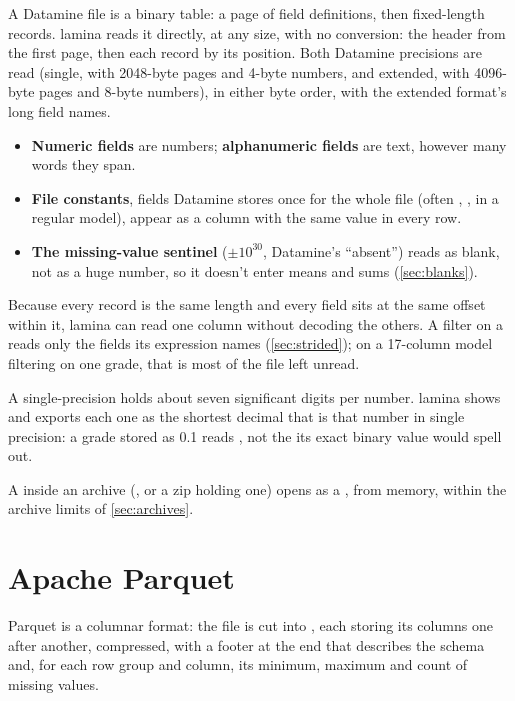 A Datamine  file is a binary table: a page of field definitions, then fixed-length records.
lamina reads it directly, at any size, with no conversion: the header from the first page, then each
record by its position. Both Datamine precisions are read (single, with 2048-byte pages and 4-byte
numbers, and extended, with 4096-byte pages and 8-byte numbers), in either byte order, with the
extended format's long field names.

\begin{itemize}
\item \textbf{Numeric fields} are numbers; \textbf{alphanumeric fields} are text, however many words
they span.
\item \textbf{File constants}, fields Datamine stores once for the whole file (often ,
,  in a regular model), appear as a column with the same value in every row.
\item \textbf{The missing-value sentinel} ($\pm10^{30}$, Datamine's ``absent'') reads as blank, not as
a huge number, so it doesn't enter means and sums (\cref{sec:blanks}).
\end{itemize}

Because every record is the same length and every field sits at the same offset within it, lamina can
read one column without decoding the others. A filter on a  reads only the fields its
expression names (\cref{sec:strided}); on a 17-column model filtering on one grade, that is most of the
file left unread.

A single-precision  holds about seven significant digits per number. lamina shows and
exports each one as the shortest decimal that is that number in single precision: a grade stored as 0.1
reads , not the  its exact binary value would spell out.

A  inside an archive (, or a zip holding one) opens as a , from
memory, within the archive limits of \cref{sec:archives}.

\section{Apache Parquet}\label{sec:parquet}

Parquet \parencite{parquetformat} is a columnar format: the file is cut into , each
storing its columns one after another, compressed, with a footer at the end that describes the schema
and, for each row group and column, its minimum, maximum and count of missing values.

